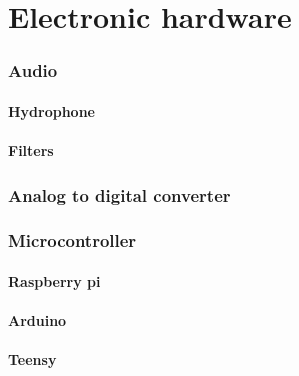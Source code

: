 \chapter{Electronic hardware}

\subsection{Audio}

\subsubsection{Hydrophone}

\subsubsection{Filters}


\subsection{Analog to digital converter}






\subsection{Microcontroller}

\subsubsection{Raspberry pi}

\subsubsection{Arduino}

\subsubsection{Teensy}


